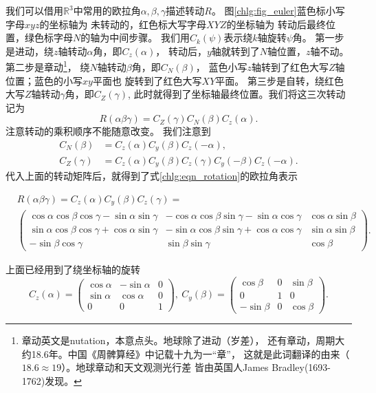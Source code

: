 我们可以借用$\mathbb{R}^3$中常用的欧拉角$\alpha,\beta,\gamma$描述转动$R$。
图\ref{chlg:fig_euler}蓝色标小写字母$xyz$的坐标轴为
未转动的，红色标大写字母$XYZ$的坐标轴为
转动后最终位置，绿色标字母$N$的轴为中间步骤。
我们用$C_k(\psi)$表示绕$k$轴旋转$\psi$角。
第一步是进动，绕$z$轴转动$\alpha$角，即$C_z(\alpha)$，
转动后，$y$轴就转到了$N$轴位置，$z$轴不动。
第二步是章动{\footnote{章动英文是nutation，本意点头。地球除了进动（岁差），
        还有章动，周期大约18.6年。中国《周髀算经》中记载十九为一“章”，
        这就是此词翻译的由来（$18.6\approx 19$）。地球章动和天文观测光行差
        皆由英国人James Bradley(1693-1762)发现。}}，
    绕$N$轴转动$\beta$角，即$C_N(\beta)$，
蓝色小写$z$轴转到了红色大写$Z$轴位置；蓝色的小写$xy$平面也
旋转到了红色大写$XY$平面。
第三步是自转，绕红色大写$Z$轴转动$\gamma$角，即$C_Z(\gamma)$,
此时就得到了坐标轴最终位置。我们将这三次转动记为
\begin{equation}\label{chlg:eqn_rotation}
    R(\alpha\beta\gamma)=C_Z(\gamma)C_N(\beta)C_z(\alpha) .
\end{equation}
注意转动的乘积顺序不能随意改变。
我们注意到
\begin{align}
    C_N(\beta) &=C_z(\alpha)C_y(\beta)C_z(-\alpha) ,  \\
    C_Z(\gamma)&=C_z(\alpha)C_y(\beta)C_z(\gamma)C_y(-\beta)C_z(-\alpha) . 
\end{align}
代入上面的转动矩阵后，就得到了式\eqref{chlg:eqn_rotation}的欧拉角表示
\begin{small}

\begin{equation}\label{chlg:eqn_rotation_euler_y}
    \begin{aligned}
        &R(\alpha\beta\gamma)=C_z(\alpha)C_y(\beta)C_z(\gamma) =   \\
        &\begin{pmatrix}
            \cos\alpha\cos\beta\cos\gamma -\sin\alpha \sin\gamma  &  -\cos\alpha \cos\beta \sin\gamma -\sin\alpha \cos\gamma & \cos\alpha \sin\beta  \\
            \sin\alpha\cos\beta\cos\gamma +\cos\alpha \sin\gamma  &  -\sin\alpha \cos\beta \sin\gamma +\cos\alpha \cos\gamma & \sin\alpha \sin\beta  \\
            -\sin\beta \cos\gamma & \sin\beta \sin\gamma & \cos\beta
        \end{pmatrix} .
    \end{aligned}
\end{equation}
\end{small}
上面已经用到了绕坐标轴的旋转
\begin{equation}\label{chlg:eqn_rotation-zy}
    {C_z}( \alpha  ) =  \begin{pmatrix}
        {\cos \alpha }&{ - \sin \alpha }&0 \\
        {\sin \alpha }&{\cos \alpha }&0 \\
        0&0&1
    \end{pmatrix} ,\
    {C_y}( \beta ) = \begin{pmatrix}
        {\cos \beta }&0&{  \sin \beta }  \\
        0&1&0\\
        { - \sin \beta } &0&{\cos \beta }
    \end{pmatrix}  .
\end{equation}

